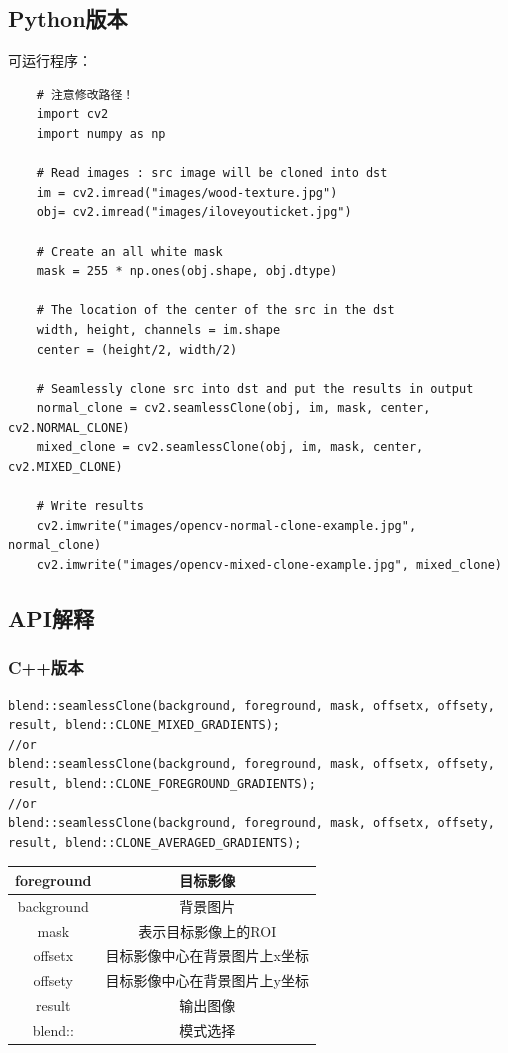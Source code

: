 \documentclass{article}
\begin{document}
    \subsection{Python版本}
    可运行程序：
    \begin{lstlisting}
    # 注意修改路径！
    import cv2
    import numpy as np
    
    # Read images : src image will be cloned into dst
    im = cv2.imread("images/wood-texture.jpg")
    obj= cv2.imread("images/iloveyouticket.jpg")
    
    # Create an all white mask
    mask = 255 * np.ones(obj.shape, obj.dtype)
    
    # The location of the center of the src in the dst
    width, height, channels = im.shape
    center = (height/2, width/2)
    
    # Seamlessly clone src into dst and put the results in output
    normal_clone = cv2.seamlessClone(obj, im, mask, center, cv2.NORMAL_CLONE)
    mixed_clone = cv2.seamlessClone(obj, im, mask, center, cv2.MIXED_CLONE)
    
    # Write results
    cv2.imwrite("images/opencv-normal-clone-example.jpg", normal_clone)
    cv2.imwrite("images/opencv-mixed-clone-example.jpg", mixed_clone)
    \end{lstlisting}
\subsection{API解释}
\subsubsection{C++版本}
\begin{lstlisting}
blend::seamlessClone(background, foreground, mask, offsetx, offsety, result, blend::CLONE_MIXED_GRADIENTS);
//or
blend::seamlessClone(background, foreground, mask, offsetx, offsety, result, blend::CLONE_FOREGROUND_GRADIENTS);
//or
blend::seamlessClone(background, foreground, mask, offsetx, offsety, result, blend::CLONE_AVERAGED_GRADIENTS);
\end{lstlisting}
	
	\begin{tabular}{cc}
		\hline
		foreground& 目标影像 \\
		\hline
		background& 背景图片\\
		\hline
		mask& 表示目标影像上的ROI\\
		\hline
		offsetx& 目标影像中心在背景图片上x坐标  \\
		\hline
		offsety& 目标影像中心在背景图片上y坐标 \\
		\hline
		result& 输出图像 \\
		\hline
		blend::&模式选择\\
	\end{tabular}
	
\end{document}

